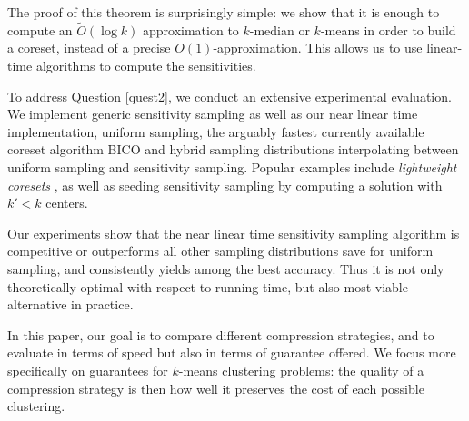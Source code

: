 
The proof of this theorem is surprisingly simple: we show that it is enough to compute an $\tilde O(\log k)$ approximation to $k$-median or $k$-means in order
to build a coreset, instead of a precise $O(1)$-approximation. This allows us to use linear-time algorithms to compute the sensitivities.


To address Question \ref{quest2}, we conduct an extensive experimental evaluation.
We implement generic sensitivity sampling as well as our near linear time implementation, uniform sampling, the arguably fastest currently available coreset algorithm BICO \cite{} and hybrid sampling distributions interpolating between uniform sampling and sensitivity sampling. Popular examples include \emph{lightweight coresets} \cite{bachem2018scalable}, as well as seeding sensitivity sampling by computing a solution with $k'<k$ centers.

Our experiments show that the near linear time sensitivity sampling algorithm is competitive or outperforms all other sampling distributions save for uniform sampling, and consistently yields among the best accuracy.
Thus it is not only theoretically optimal with respect to running time, but also most viable alternative in practice. 


In this paper, our goal is to compare different compression strategies, and to evaluate in terms of speed but also in terms of guarantee offered. We focus more specifically on guarantees for $k$-means clustering problems: the quality of a compression strategy is then how well it preserves the cost of each possible clustering.


